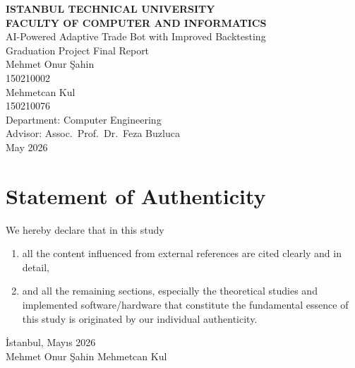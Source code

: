 \documentclass[a4paper, 12pt, titlepage]{article}
\title{\thetitle}
\author{Mehmet Onur Şahin \and Mehmetcan Kul}
\date{\thedate}
\newcommand{\thetitle}{AI-Powered Adaptive Trade Bot with Improved Backtesting}
\newcommand{\thedate}{May 2026}
\newcommand{\theturkishdate}{Mayıs 2026}
\begin{document}
\shorthandoff{=}


\begin{titlepage}
    \bfseries
    \sffamily
    \begin{center}
        \LARGE{\textbf{ISTANBUL TECHNICAL UNIVERSITY \\
               FACULTY OF COMPUTER AND INFORMATICS} } \\
        \vspace{5.5cm}
        \LARGE{\thetitle}  \\
        \vspace{4cm}
        \Large{Graduation Project Final Report} \\
        \vspace{0.5cm}
        \Large{Mehmet Onur Şahin} \\
        \Large{150210002} \\
        \vspace{0.3cm}
        \Large{Mehmetcan Kul} \\
        \Large{150210076} \\
        \vspace{2.5cm}
        \large{Department: Computer Engineering} \\
        \vspace{1.2cm}
        \large{Advisor: Assoc.\ Prof.\ Dr.\ Feza Buzluca} \\
        \vspace{\fill}
        \large{\normalfont \sffamily \thedate}
    \end{center}
\end{titlepage}

\newpage
\section*{Statement of Authenticity}
We hereby declare that in this study
\begin{enumerate}
    \item all the content influenced from external references are cited clearly and in detail,
    \item and all the remaining sections, especially the theoretical studies and implemented software/hardware that constitute the fundamental essence of this study is originated by our individual authenticity.
\end{enumerate}
\vspace{1em}
İstanbul, \theturkishdate
\vspace{3em}\\ Mehmet Onur Şahin \hfill Mehmetcan Kul
\end{document}
